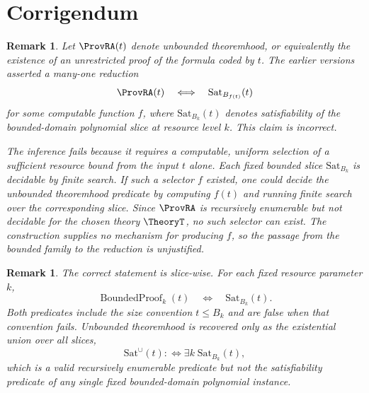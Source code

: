 \documentclass[letterpaper,10pt]{article}
\theoremstyle{upright}
\theoremstyle{upright}
\newtheorem{remark}[theorem]{Remark}
\begin{document}
\section{Corrigendum}
\label{sec:error}

\begin{remark}
	Let $\ProvRA(t)$ denote unbounded theoremhood, or equivalently the existence of an unrestricted proof of the formula coded by $t$. The earlier versions asserted a \emph{many-one reduction}
	\begin{equation}
		\ProvRA(t)
		\quad\Longleftrightarrow\quad
		\mathrm{Sat}_{B_{f(t)}}(t)
	\end{equation}
	for some computable function $f$, where $\mathrm{Sat}_{B_k}(t)$ denotes satisfiability of the bounded-domain polynomial slice at resource level $k$. This claim is incorrect.

	The inference fails because it requires a computable, uniform selection of a sufficient resource bound from the input $t$ alone. Each fixed bounded slice $\mathrm{Sat}_{B_k}$ is decidable by finite search. If such a selector $f$ existed, one could decide the unbounded theoremhood predicate by computing $f(t)$ and running finite search over the corresponding slice. Since $\ProvRA$ is recursively enumerable but not decidable for the chosen theory $\TheoryT$, no such selector can exist. The construction supplies no mechanism for producing $f$, so the passage from the bounded family to the reduction is unjustified.
\end{remark}

\begin{remark}
	The correct statement is slice-wise. For each fixed resource parameter $k$,
	\begin{equation}
		\operatorname{BoundedProof}_k(t)
		\quad\Longleftrightarrow\quad
		\mathrm{Sat}_{B_k}(t).
	\end{equation}
	Both predicates include the size convention $t\leq B_k$ and are false when that convention fails.
	Unbounded theoremhood is recovered only as the existential union over all slices,
	\begin{equation}
		\mathrm{Sat}^{\cup}(t) :\iff \exists k\;\mathrm{Sat}_{B_k}(t),
	\end{equation}
	which is a valid recursively enumerable predicate but not the satisfiability predicate of any single fixed bounded-domain polynomial instance.
\end{remark}
\end{document}
